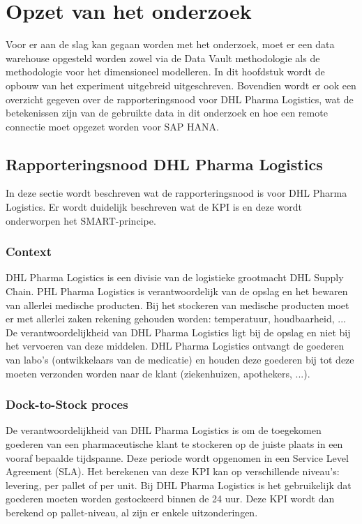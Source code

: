 
\chapter{Opzet van het onderzoek}
\label{ch:voorbereidingonderzoek}

Voor er aan de slag kan gegaan worden met het onderzoek, moet er een data warehouse opgesteld worden zowel via de Data Vault methodologie als de methodologie voor het dimensioneel modelleren. In dit hoofdstuk wordt de opbouw van het experiment uitgebreid uitgeschreven. Bovendien wordt er ook een overzicht gegeven over de rapporteringsnood voor DHL Pharma Logistics, wat de betekenissen zijn van de gebruikte data in dit onderzoek en hoe een remote connectie moet opgezet worden voor SAP HANA.

\section{Rapporteringsnood DHL Pharma Logistics}
\label{ch:rapporteringsnood}
In deze sectie wordt beschreven wat de rapporteringsnood is voor DHL Pharma Logistics. Er wordt duidelijk beschreven wat de KPI is en deze wordt onderworpen het SMART-principe. 

\subsection{Context}
DHL Pharma Logistics is een divisie van de logistieke grootmacht DHL Supply Chain. PHL Pharma Logistics is verantwoordelijk van de opslag en het bewaren van allerlei medische producten. Bij het stockeren van medische producten moet er met allerlei zaken rekening gehouden worden: temperatuur, houdbaarheid, ... De verantwoordelijkheid van DHL Pharma Logistics ligt bij de opslag en niet bij het vervoeren van deze middelen. DHL Pharma Logistics ontvangt de goederen van labo's (ontwikkelaars van de medicatie) en houden deze goederen bij tot deze moeten verzonden worden naar de klant (ziekenhuizen, apothekers, ...).

\subsection{Dock-to-Stock proces}
De verantwoordelijkheid van DHL Pharma Logistics is om de toegekomen goederen van een pharmaceutische klant te stockeren op de juiste plaats in een vooraf bepaalde tijdspanne. Deze periode wordt opgenomen in een Service Level Agreement (SLA). Het berekenen van deze KPI kan op verschillende niveau's: levering, per pallet of per unit. Bij DHL Pharma Logistics is het gebruikelijk dat goederen moeten worden gestockeerd binnen de 24 uur. Deze KPI wordt dan berekend op pallet-niveau, al zijn er enkele uitzonderingen.


